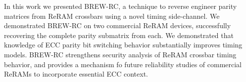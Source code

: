 In this work we presented BREW-RC, a technique to reverse engineer parity matrices from ReRAM crossbars using a novel timing side-channel. We demonstrated BREW-RC on two commercial ReRAM devices, successfully recovering the complete parity submatrix from each. We demonstrated that knowledge of ECC parity bit switching behavior substantially improves timing models. BREW-RC strengthens security analysis of ReRAM crossbar timing behavior, and provides a mechanism fo future reliability studies of commercial ReRAMs to incorporate essential ECC context.